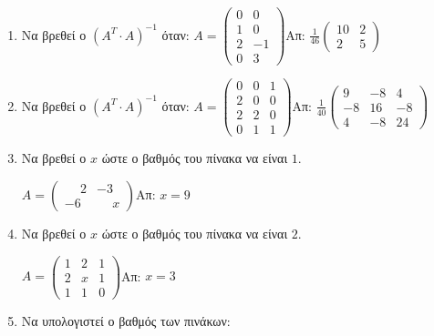 \documentclass[a4paper,12pt]{article}
\begin{document}
\begin{center}
\end{center}

\vspace{2\baselineskip}

\begin{enumerate}

\item Να βρεθεί ο $(A^T \cdot A)^{-1}$ όταν:
\(
A=\begin{pmatrix}
0 & 0 \\
1 & 0 \\
2 & -1 \\
0 & 3 
\end{pmatrix}
\)\hfill Απ: $\frac{1}{46}\begin{pmatrix}
10 & 2 \\
2 & 5
\end{pmatrix}$

\item Να βρεθεί ο $(A^T \cdot A)^{-1}$ όταν:
\(
Α=\begin{pmatrix}
0 & 0 & 1 \\
2 & 0 & 0 \\
2 & 2 & 0 \\
0 & 1 & 1
\end{pmatrix}
\)\hfill Απ: $\frac{1}{40}\begin{pmatrix}
9 & -8 & 4 \\
-8 & 16 & -8 \\
4 & -8 & 24
\end{pmatrix}$


\item Να βρεθεί ο $x$ ώστε ο βαθμός του πίνακα να είναι $1$.

$A=\begin{pmatrix}
\phantom{-}2 & -3 \\
-6 & \phantom{-}x
\end{pmatrix}$\hfill Απ: $x=9$

\item Να βρεθεί ο $x$ ώστε ο βαθμός του πίνακα να είναι $2$.

$Α=\begin{pmatrix}
1 & 2 & 1\\
2 & x & 1 \\
1 & 1 & 0
\end{pmatrix}$\hfill Απ: $x=3$

\item Να υπολογιστεί ο βαθμός των πινάκων:


\end{enumerate}
\end{document}
